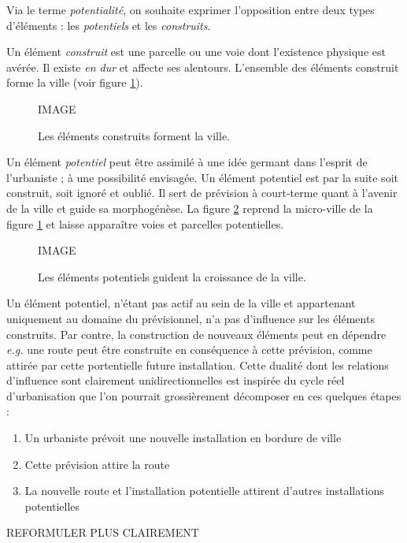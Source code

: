 \documentclass[12pt]{article}
\begin{document}
Via le terme \textit{potentialité}, on souhaite exprimer l'opposition
entre deux types d'éléments : les \textit{potentiels} et les
\textit{construits}.

Un élément \textit{construit} est une parcelle ou une voie dont
l'existence physique est avérée. Il existe \textit{en dur} et affecte
ses alentours. L'ensemble des éléments construit forme la ville (voir
figure \ref{fig:construit}).

\begin{figure}
  \centering
  IMAGE
  \caption{Les éléments construits forment la ville.}
  \label{fig:construit}
\end{figure}

Un élément \textit{potentiel} peut être assimilé à une idée germant
dans l'esprit de l'urbaniste ; à une possibilité envisagée. Un élément
potentiel est par la suite soit construit, soit ignoré et oublié. Il
sert de prévision à court-terme quant à l'avenir de la ville et guide
sa morphogénèse. La figure \ref{fig:potentiel} reprend la micro-ville
de la figure \ref{fig:construit} et laisse apparaître voies et
parcelles potentielles.

\begin{figure}
  \centering
  IMAGE
  \caption{Les éléments potentiels guident la croissance
    de la ville.}
  \label{fig:potentiel}
\end{figure}

Un élément potentiel, n'étant pas actif au sein de la ville et
appartenant uniquement au domaine du prévisionnel, n'a pas d'influence
sur les éléments construits. Par contre, la construction de nouveaux
éléments peut en dépendre \textit{e.g.} une route peut être construite
en conséquence à cette prévision, comme attirée par cette portentielle
future installation. Cette dualité dont les relations d'influence sont
clairement unidirectionnelles est inspirée du cycle réel
d'urbanisation que l'on pourrait grossièrement décomposer en ces
quelques étapes :

\begin{enumerate}
\item{Un urbaniste prévoit une nouvelle installation en bordure de
  ville}
\item{Cette prévision attire la route}
\item{La nouvelle route et l'installation potentielle attirent
  d'autres installations potentielles}
\end{enumerate}

REFORMULER PLUS CLAIREMENT
\end{document}
